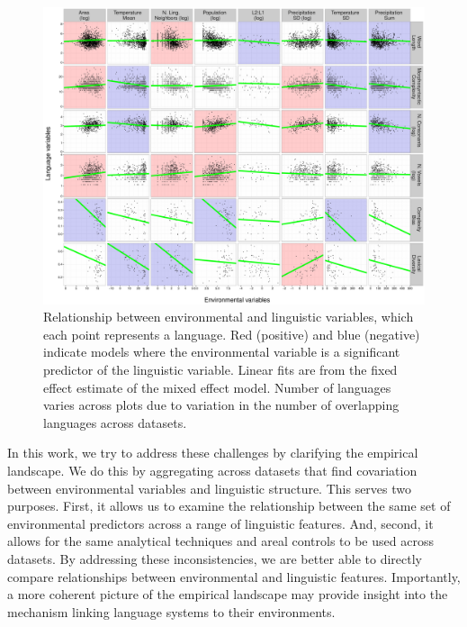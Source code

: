 \documentclass[10pt,letterpaper]{article}
\begin{document}
 \begin{figure}[t]
\begin{center}
\includegraphics[scale = .4]{figs/plot1.pdf}
\end{center}
\vspace{-.5em}
\caption{Relationship between environmental and linguistic variables, which each point represents a language. Red (positive) and blue (negative) indicate models where the environmental variable is a significant predictor of the linguistic variable. Linear fits are from the fixed effect estimate of the mixed effect model. Number of languages varies across plots due to variation in the number of overlapping languages across datasets.}
\label{fig:cbias}
\vspace{-1em}
\end{figure}

In this work, we try to address these challenges by clarifying the empirical landscape. We do this by aggregating across datasets that find covariation between environmental variables and linguistic structure. This serves two purposes. First, it allows us to examine the relationship between the same set of environmental predictors across a range of linguistic features. And, second, it allows for the same analytical techniques and areal controls to be used across datasets. By addressing these inconsistencies, we are better able to  directly compare relationships between environmental and linguistic features. Importantly, a more coherent picture of the empirical landscape may provide insight into the mechanism linking language systems to their environments.
\end{document}
